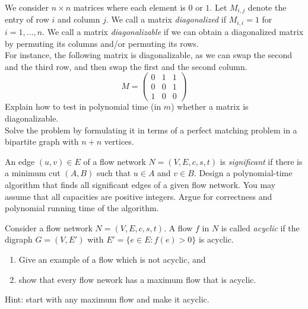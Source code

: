 \documentclass{article}
\begin{document}
\newpage

\begin{exercise}
We consider $n\times n$ matrices where each element is $0$ or $1$. Let $M_{i,j}$ denote the entry of row $i$ and column $j$. We call a matrix \textit{diagonalized} if $M_{i,i}=1$ for $i = 1, \dots, n$. We call a matrix \textit{diagonalizable} if we can obtain a diagonalized matrix by permuting its columns and/or permuting its rows. \\
For instance, the following matrix is diagonalizable, as we can swap the second and the third row, and then swap the first and the second column.\begin{equation*}
    M = \left(\begin{array}{ccc}
         0&1&1  \\
         0&0&1\\
         1&0&0
    \end{array}\right)
\end{equation*}
Explain how to test in polynomial time (in $m$) whether a matrix is diagonalizable. \\
Solve the problem by formulating it in terms of a perfect matching problem in a bipartite graph with $n+n$ vertices.
\end{exercise}

\begin{exercise}
    An edge $(u,v)\in E$ of a flow network $N= (V,E,c,s,t)$ is \textit{significant} if there is a minimum cut $(A,B)$ such that $u\in A$ and $v\in B$. Design a polynomial-time algorithm that finds all significant edges of a given flow network. You may assume that all capacities are positive integers. Argue for correctness and polynomial running time of the algorithm. 
\end{exercise}

\begin{exercise}
    Consider a flow network $N= (V,E,c,s,t)$. A flow $f$ in $N$ is called \textit{acyclic} if the digraph $G= (V,E')$ with $E'= \{e\in E: f(e)>0\}$ is acyclic. \begin{enumerate}
        \item Give an example of a flow which is not acyclic, and 
        \item show that every flow nework has a maximum flow that is acyclic.
    \end{enumerate}
    Hint: start with any maximum flow and make it acyclic.
\end{exercise}
\end{document}
